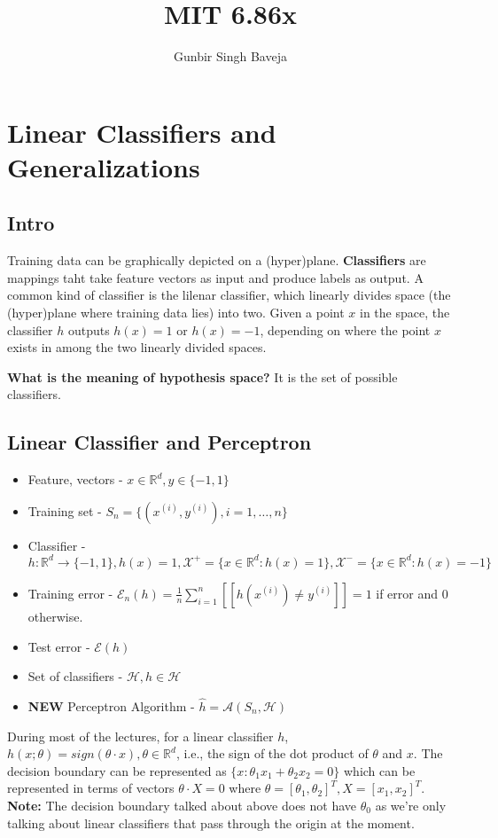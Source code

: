 \documentclass{article}
\author{Gunbir Singh Baveja}
\title{MIT 6.86x}
\begin{document}
\maketitle

\section{Linear Classifiers and Generalizations}
\subsection{Intro}

Training data can be graphically depicted on a (hyper)plane. \textbf{Classifiers} are mappings taht take feature vectors as input and produce labels as output. A common kind of classifier is the lilenar classifier, which linearly divides space (the (hyper)plane where training data lies) into two. Given a point $x$ in the space, the classifier $h$ outputs $h(x)=1$ or $h(x)=-1$, depending on where the point $x$ exists in among the two linearly divided spaces.


\textbf{What is the meaning of hypothesis space?} It is the set of possible classifiers.

\subsection{Linear Classifier and Perceptron}
\begin{itemize}
\item Feature, vectors - $x\in\mathbb{R}^d, y\in\{-1,1\}$
\item Training set - $S_n = \{\left(x^{(i)},y^{(i)}\right), i=1,\ldots,n\}$
\item Classifier - $h:\mathbb{R}^d\rightarrow\{-1,1\},h(x)=1,\mathcal{X}^{+}=\{x\in\mathbb{R}^d:h(x)=1\},\mathcal{X}^{-}=\{x\in\mathbb{R}^d:h(x)=-1\}$
\item Training error - $\mathcal{E}_n(h)=\frac{1}{n}\sum\limits_{i=1}^n[\![h\left(x^{(i)}\right)\neq y^{(i)}]\!]=1$ if error and $0$ otherwise.
\item Test error - $\mathcal{E}(h)$
\item Set of classifiers - $\mathcal{H}, h\in\mathcal{H}$
\item \textbf{NEW} Perceptron Algorithm - $\hat{h}=\mathcal{A}\left(S_n,\mathcal{H}\right)$
\end{itemize}

During most of the lectures, for a linear classifier $h$, $h(x;\theta)=sign(\theta\cdot x), \theta\in\mathbb{R}^d$, i.e., the sign of the dot product of $\theta$ and $x$. The decision boundary can be represented as $\{x:\theta_1x_1+\theta_2x_2=0\}$ which can be represented in terms of vectors $\theta\cdot X=0$ where $\theta = [\theta_1,\theta_2]^T, X=[x_1,x_2]^T$. \textbf{Note:} The decision boundary talked about above does not have $\theta_0$ as we're only talking about linear classifiers that pass through the origin at the moment.
\end{document}
